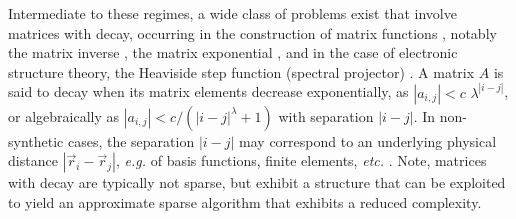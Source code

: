 Intermediate to these regimes, a wide class of problems exist that involve
matrices with decay, occurring in the construction of matrix functions
\cite{benzigolub}, notably the matrix inverse \cite{demkomosssmith,
Benzi:2000:Inv}, the matrix exponential \cite{Iserles:2000:Decay}, and in the
case of electronic structure theory, the Heaviside step function (spectral
projector) \cite{McWeeny12061956, PhysRevB.58.12704, Challacombe:1999:DMM,
Challacombe:2000:SpMM, Benzi:2007:Decay, BenziDecay2012}. A matrix $A$ is said
to decay when its matrix elements decrease exponentially, as $\left| a_{i, j}
\right| < c \,\, \lambda^{\left| i-j \right|}$, or algebraically as $\left|
a_{i, j} \right| < c / ( \left| i-j \right|^{\lambda}+1 )$ with separation
$|i-j|$. In non-synthetic cases, the separation $|i-j|$ may correspond to an
underlying physical distance $|\vec{r}_{i}-\vec{r}_{j}|$, \emph{e.g.} of basis
functions, finite elements, \emph{etc.} \cite{BenziDecay2012}. Note, matrices
with decay are typically not sparse, but exhibit a structure that can be
exploited to yield an approximate sparse algorithm that exhibits a reduced
complexity.

